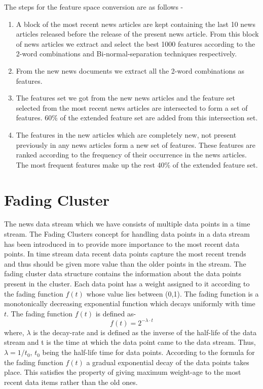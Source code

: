 \documentclass[a4paper,12bp]{report}
\begin{document}
The steps for the feature space conversion are as follows - 
\begin{enumerate}
\item A block of the most recent news articles are kept containing the last 10 news articles released before the release of the present news article. From this block of news articles we extract and select the best 1000 features according to the 2-word combinations and Bi-normal-separation techniques respectively.

\item From the new news documents we extract all the 2-word combinations as features.

\item The features set we got from the new news articles and the feature set selected from the most recent news articles are intersected to form a set of features. 60\% of the extended feature set are added from this intersection set. 

\item The features in the new articles which are completely new, not present previously in any news articles form a new set of features. These features are ranked according to the frequency of their occurrence in the news articles. The most frequent features make up the rest 40\% of the extended feature set. 
\end{enumerate}

\section{Fading Cluster}
\label{sec:fading}
The news data stream which we have consists of multiple data points in a time stream. The Fading Clusters concept for handling data points in a data stream has been introduced in \cite{Aggarwal:2005} to provide more importance to the most recent data points. In time stream data recent data points capture the most recent trends and thus should be given more value than the older points in the stream. The fading cluster data structure contains the information about the data points present in the cluster. Each data point has a weight assigned to it according to the fading function $f(t)$ whose value lies between (0,1). The fading function is a monotonically decreasing exponential function which decays uniformly with time $t$. The fading function $f(t)$ is defined as- 
\begin{equation}
f(t) = 2^{-\lambda \cdot t}
\end{equation}
where, $\lambda$ is the decay-rate and is defined as the inverse of the half-life of the data stream and t is the time at which the data point came to the data stream. Thus, $\lambda = 1/t_{0}$, $t_{0}$ being the half-life time for data points. According to the formula for the fading function $f(t)$ a gradual exponential decay of the data points takes place. This satisfies the property of giving maximum weight-age to the most recent data items rather than the old ones.
\end{document}
